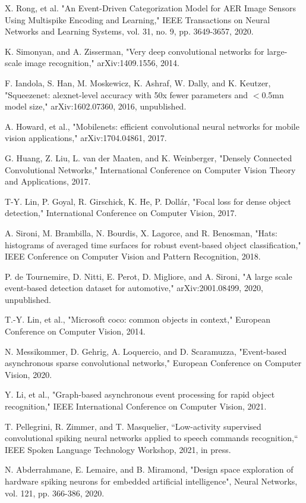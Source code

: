 \documentclass[conference]{IEEEtran}
\begin{document}
\begin{thebibliography}{00}
 X. Rong, et al. "An Event-Driven Categorization Model for AER Image Sensors Using Multispike Encoding and Learning," IEEE Transactions on Neural Networks and Learning Systems, vol. 31, no. 9, pp. 3649-3657, 2020.

 K. Simonyan, and A. Zisserman, "Very deep convolutional networks for large-scale image recognition," arXiv:1409.1556, 2014.

 F. Iandola, S. Han, M. Moskewicz, K. Ashraf, W. Dally, and K. Keutzer, "Squeezenet: alexnet-level accuracy with 50x fewer parameters and $<$0.5mn model size,"	arXiv:1602.07360, 2016, unpublished.

 A. Howard, et al., "Mobilenets: efficient convolutional neural networks for mobile vision applications," arXiv:1704.04861, 2017.

 G. Huang, Z. Liu, L. van der Maaten, and K. Weinberger, "Densely Connected Convolutional Networks," International Conference on Computer Vision Theory and Applications, 2017.

 T-Y. Lin, P. Goyal, R. Girschick, K. He, P. Dollár, "Focal loss for dense object detection," International Conference on Computer Vision, 2017.

 A. Sironi, M. Brambilla, N. Bourdis, X. Lagorce, and R. Benosman, "Hats: histograms of averaged time surfaces for robust event-based object classification," IEEE Conference on Computer Vision and Pattern Recognition, 2018.

 P. de Tournemire, D. Nitti, E. Perot, D. Migliore, and A. Sironi, "A large scale event-based detection dataset for automotive," arXiv:2001.08499, 2020, unpublished.

 T.-Y. Lin, et al., "Microsoft coco: common objects in context," European Conference on
Computer Vision, 2014.

 N. Messikommer, D. Gehrig, A. Loquercio, and D. Scaramuzza, "Event-based asynchronous sparse convolutional networks," European Conference on Computer Vision, 2020.

 Y. Li, et al., "Graph-based asynchronous event processing for rapid object recognition," IEEE International Conference on Computer Vision, 2021.

 T. Pellegrini, R. Zimmer, and T. Masquelier, ``Low-activity supervised convolutional spiking neural networks applied to speech commands recognition,`` IEEE Spoken Language Technology Workshop, 2021, in press.

 N. Abderrahmane, E. Lemaire, and B. Miramond, "Design space exploration of hardware spiking neurons for embedded artificial intelligence", Neural Networks, vol. 121, pp. 366-386, 2020.

\end{thebibliography}
\end{document}
